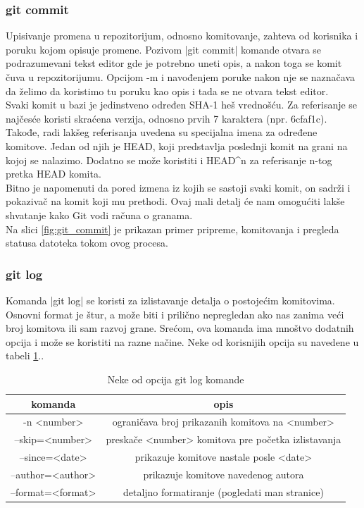 \documentclass[a4paper]{article}
\begin{document}
{\subsubsection*{git commit}
\label{subsec:git_commit}
Upisivanje promena u repozitorijum, odnosno komitovanje, zahteva od korisnika i poruku kojom opisuje promene. Pozivom |git commit| komande otvara se podrazumevani tekst editor gde je potrebno uneti opis, a nakon toga se komit čuva u repozitorijumu. Opcijom -m i navođenjem poruke nakon nje se naznačava da želimo da koristimo tu poruku kao opis i tada se ne otvara tekst editor.\\

Svaki komit u bazi je jedinstveno određen SHA-1 heš vrednošću. Za referisanje se najčesće koristi skraćena verzija, odnosno prvih 7 karaktera (npr. 6cfaf1c).
Takođe, radi lakšeg referisanja uvedena su specijalna imena za određene komitove. Jedan od njih je HEAD, koji predstavlja poslednji komit na grani na kojoj se nalazimo. Dodatno se može koristiti i HEAD\^{}n za referisanje n-tog pretka HEAD komita.\\

Bitno je napomenuti da pored izmena iz kojih se sastoji svaki komit, on sadrži i pokazivač na komit koji mu prethodi. Ovaj mali detalj će nam omogućiti lakše shvatanje kako Git vodi računa o granama.\\
Na slici \ref{fig:git_commit} je prikazan primer pripreme, komitovanja i pregleda statusa datoteka tokom ovog procesa.

\subsubsection*{git log}
\label{log}
Komanda |git log| se koristi za izlistavanje detalja o postojećim komitovima. Osnovni format je štur, a može biti i prilično nepregledan ako nas zanima veći broj komitova ili sam razvoj grane. Srećom, ova komanda ima mnoštvo dodatnih opcija i može se koristiti na razne načine. Neke od korisnijih opcija su navedene u tabeli \ref{tab:tabela1}.. 

\begin{table}[h!]
\begin{center}


\begin{tabular}{cc} \hline
komanda & opis\\ \hline
-n <number> & ograničava broj prikazanih komitova na <number> \\
--skip=<number> & preskače <number> komitova pre početka izlistavanja \\
--since=<date> & prikazuje komitove nastale posle <date> \\
--author=<author> & prikazuje komitove navedenog autora \\
--format=<format> & detaljno formatiranje (pogledati man stranice)
\end{tabular}
\caption{Neke od opcija git log komande}
\end{center}
\label{tab:tabela1}


\end{table}}
\end{document}
